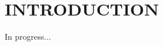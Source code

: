 %
%
%
%



\pagestyle{plain} %
\setcounter{page}{1}


\chapter{\uppercase {Introduction}}

In progress...


